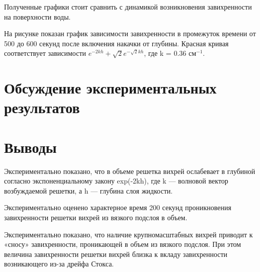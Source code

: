 Полученные графики стоит сравнить с динамикой возникновения завихренности на поверхности воды. 

На рисунке  показан график зависимости завихренности в промежуток времени от 500 до 600 секунд после включения накачки от глубины. Красная кривая соответствует зависимости $e^{-2kh}+\sqrt{2}e^{-\sqrt{2}kh}$, где k = 0.36 см$^{-1}$.

\section{Обсуждение экспериментальных результатов} \label{sect6_4}
\section{Выводы} \label{sect6_5}
Экспериментально показано, что в объеме решетка вихрей ослабевает в глубиной согласно экспоненциальному закону exp(-2kh), где k — волновой вектор возбуждаемой решетки, а h — глубина слоя жидкости. 

Экспериментально оценено характерное время 200 секунд проникновения завихренности решетки вихрей из вязкого подслоя в объем.

Экспериментально показано, что наличие крупномасштабных вихрей приводит к «сносу» завихренности, проникающей в объем из вязкого подслоя. При этом величина завихренности решетки вихрей  близка к вкладу завихренности возникающего из-за дрейфа Стокса.
\clearpage